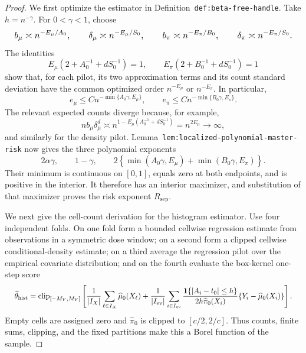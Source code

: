 \documentclass{article}
\begin{document}
\begin{proof}
We first optimize the estimator in Definition~\texttt{def:beta-free-handle}. Take \(h=n^{-\gamma}\). For \(0<\gamma<1\), choose
\[
\makebox[\linewidth][c]{\resizebox{0.98\linewidth}{!}{\(\displaystyle b_\mu\asymp n^{-E_\mu/A_0},\qquad \delta_\mu\asymp n^{-E_\mu/S_0},
\qquad
b_\pi\asymp n^{-E_\pi/B_0},\qquad \delta_\pi\asymp n^{-E_\pi/S_0}.\)}}
\]
The identities
\[
E_\mu(2+A_0^{-1}+dS_0^{-1})=1,
\qquad
E_\pi(2+B_0^{-1}+dS_0^{-1})=1
\]
show that, for each pilot, its two approximation terms and its count standard deviation have the common optimized order \(n^{-E_\mu}\) or \(n^{-E_\pi}\). In particular,
\[
e_\mu\le Cn^{-\min\{A_0\gamma,E_\mu\}},
\qquad
e_\pi\le Cn^{-\min\{B_0\gamma,E_\pi\}}.
\]
The relevant expected counts diverge because, for example,
\[
nb_\mu\delta_\mu^d
\asymp n^{1-E_\mu(A_0^{-1}+dS_0^{-1})}=n^{2E_\mu}\to\infty,
\]
and similarly for the density pilot. Lemma~\texttt{lem:localized-polynomial-master-risk} now gives the three polynomial exponents
\[
2\alpha\gamma,\qquad 1-\gamma,\qquad
2\left\{\min(A_0\gamma,E_\mu)+\min(B_0\gamma,E_\pi)\right\}.
\]
Their minimum is continuous on \([0,1]\), equals zero at both endpoints, and is positive in the interior. It therefore has an interior maximizer, and substitution of that maximizer proves the risk exponent \(R_{\mathrm{sep}}\).

We next give the cell-count derivation for the histogram estimator. Use four independent folds. On one fold form a bounded cellwise regression estimate from observations in a symmetric dose window; on a second form a clipped cellwise conditional-density estimate; on a third average the regression pilot over the empirical covariate distribution; and on the fourth evaluate the box-kernel one-step score
\[
\makebox[\linewidth][c]{\resizebox{0.98\linewidth}{!}{\(\displaystyle \widehat\theta_{\mathrm{hist}}
=\operatorname{clip}_{[-M_Y,M_Y]}\left[
\frac1{|I_X|}\sum_{\ell\in I_X}\widehat\mu_0(X_\ell)
+\frac1{|I_{\mathrm{ev}}|}\sum_{i\in I_{\mathrm{ev}}}
\frac{\mathbf 1\{\lvert A_i-t_0\rvert\le h\}}{2h\widehat\pi_0(X_i)}
\{Y_i-\widehat\mu_0(X_i)\}
\right].\)}}
\]
Empty cells are assigned zero and \(\widehat\pi_0\) is clipped to \([c/2,2/c]\). Thus counts, finite sums, clipping, and the fixed partitions make this a Borel function of the sample.


\end{proof}
\end{document}
